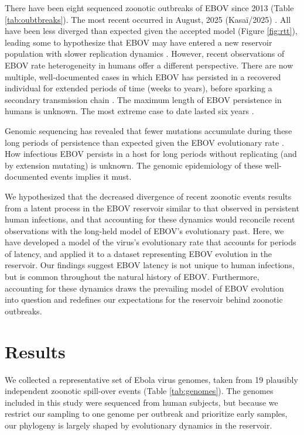 \documentclass[11pt,a4paper]{article}
\begin{document}
There have been eight sequenced zoonotic outbreaks of EBOV since 2013 \cite{Lam2015-gx,Nsio2020-sx,Kinganda-Lusamaki2024-kg,Mbala-Kingebeni2019-mz,UnknownUnknown-ru} (Table \ref{tab:oubtbreaks}). 
The most recent occurred in August, 2025 (Kasa{\"i}/2025) \cite{Unknown2025-yc,Wawina-Bokalanga2025-gu}.
All have been less diverged than expected given the accepted model (Figure \ref{fig:rtt}), leading some to hypothesize that EBOV may have entered a new reservoir population with slower replication dynamics \cite{Lam2015-gx}. 
However, recent observations of EBOV rate heterogeneity in humans offer a different perspective.
There are now multiple, well-documented cases in which EBOV has persisted in a recovered individual for extended periods of time (weeks to years), before sparking a secondary transmission chain \cite{Whitmer2018-qg,Diallo2016-be,Thorson2021-xs,Keita2021-ne}.
The maximum length of EBOV persistence in humans is unknown.
The most extreme case to date lasted six years \cite{Keita2021-ne}.


Genomic sequencing has revealed that fewer mutations accumulate during these long periods of persistence than expected given the EBOV evolutionary rate \cite{Diallo2016-be,Keita2021-ne}.
How infectious EBOV persists in a host for long periods without replicating (and by extension mutating) is unknown.
The genomic epidemiology of these well-documented events implies it must.

We hypothesized that the decreased divergence of recent zoonotic events results from a latent process in the EBOV reservoir similar to that observed in persistent human infections, and that accounting for these dynamics would reconcile recent observations with the long-held model of EBOV's evolutionary past.  
Here, we have developed a model of the virus's evolutionary rate that accounts for periods of latency, and applied it to a dataset representing EBOV evolution in the reservoir.
Our findings suggest EBOV latency is not unique to human infections, but is common throughout the natural history of EBOV.
Furthermore, accounting for these dynamics draws the prevailing model of EBOV evolution into question and redefines our expectations for the reservoir behind zoonotic outbreaks.

\section*{Results} 

We collected a representative set of Ebola virus genomes, taken from 19 plausibly independent zoonotic spill-over events (Table \ref{tab:genomes}).
The genomes included in this study were sequenced from human subjects, but because we restrict our sampling to one genome per outbreak and prioritize early samples, our phylogeny is largely shaped by evolutionary dynamics in the reservoir.
\end{document}
